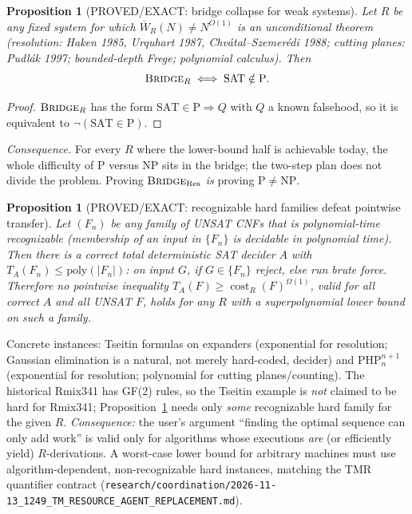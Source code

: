 \documentclass[11pt]{article}
\newtheorem{proposition}[theorem]{Proposition}
\theoremstyle{definition}\newtheorem{definition}[theorem]{Definition}
\theoremstyle{remark}\newtheorem{remark}[theorem]{Remark}
\begin{document}
\begin{proposition}[PROVED/EXACT: bridge collapse for weak systems]\label{p:collapse}
Let $R$ be any fixed system for which $\overline W_R(N)\ne N^{O(1)}$ is an unconditional theorem (resolution: Haken 1985,
Urquhart 1987, Chv\'atal--Szemer\'edi 1988; cutting planes: Pudl\'ak 1997; bounded-depth Frege; polynomial calculus). Then
\[
\textsc{Bridge}_R\iff \mathrm{SAT}\notin\mathrm{P}.
\]
\end{proposition}
\begin{proof}
$\textsc{Bridge}_R$ has the form $\mathrm{SAT}\in\mathrm P\Rightarrow Q$ with $Q$ a known falsehood, so it is equivalent to
$\neg(\mathrm{SAT}\in\mathrm P)$.
\end{proof}
\noindent\emph{Consequence.} For every $R$ where the lower-bound half is achievable today, the whole difficulty of P versus NP sits
in the bridge; the two-step plan does not divide the problem. Proving $\textsc{Bridge}_{\mathrm{Res}}$ \emph{is} proving
$\mathrm P\neq\mathrm{NP}$.

\begin{proposition}[PROVED/EXACT: recognizable hard families defeat pointwise transfer]\label{p:recog}
Let $(F_n)$ be any family of UNSAT CNFs that is polynomial-time recognizable (membership of an input in $\{F_n\}$ is decidable in
polynomial time). Then there is a correct total deterministic SAT decider $A$ with $T_A(F_n)\le\mathrm{poly}(|F_n|)$:
on input $G$, if $G\in\{F_n\}$ reject, else run brute force. Therefore no pointwise inequality
$T_A(F)\ge \operatorname{cost}_R(F)^{\Omega(1)}$, valid for all correct $A$ and all UNSAT $F$, holds for any $R$ with a
superpolynomial lower bound on such a family.
\end{proposition}
\noindent Concrete instances: Tseitin formulas on expanders (exponential for resolution; Gaussian elimination is a natural, not
merely hard-coded, decider) and $\mathrm{PHP}^{n+1}_n$ (exponential for resolution; polynomial for cutting planes/counting). The
historical Rmix341 has GF(2) rules, so the Tseitin example is \emph{not} claimed to be hard for Rmix341; Proposition~\ref{p:recog}
needs only \emph{some} recognizable hard family for the given $R$. \emph{Consequence:} the user's argument ``finding the optimal sequence
can only add work'' is valid only for algorithms whose executions \emph{are} (or efficiently yield) $R$-derivations. A worst-case
lower bound for arbitrary machines must use algorithm-dependent, non-recognizable hard instances, matching the TMR quantifier contract
(\texttt{research/coordination/2026-11-13\_1249\_TM\_RESOURCE\_AGENT\_REPLACEMENT.md}).
\end{document}
